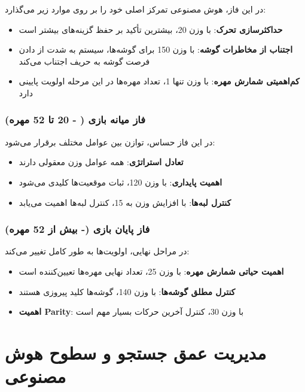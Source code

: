 \documentclass[12pt]{article}
\begin{document}
	در این فاز، هوش مصنوعی تمرکز اصلی خود را بر روی موارد زیر می‌گذارد:
	
	\begin{itemize}
		\item \textbf{حداکثرسازی تحرک}: با وزن 20، بیشترین تأکید بر حفظ گزینه‌های بیشتر است
		\item \textbf{اجتناب از مخاطرات گوشه}: با وزن 150 برای گوشه‌ها، سیستم به شدت از دادن فرصت گوشه به حریف اجتناب می‌کند
		\item \textbf{کم‌اهمیتی شمارش مهره}: با وزن تنها 1، تعداد مهره‌ها در این مرحله اولویت پایینی دارد
	\end{itemize}
	
	\subsubsection{فاز میانه بازی ( - 20 تا 52 مهره)}
	
	در این فاز حساس، توازن بین عوامل مختلف برقرار می‌شود:
	
	\begin{itemize}
		\item \textbf{تعادل استراتژی}: همه عوامل وزن معقولی دارند
		\item \textbf{اهمیت پایداری}: با وزن 120، ثبات موقعیت‌ها کلیدی می‌شود  
		\item \textbf{کنترل لبه‌ها}: با افزایش وزن به 15، کنترل لبه‌ها اهمیت می‌یابد
	\end{itemize}
	
	\subsubsection{فاز پایان بازی (- بیش از 52 مهره)}
	
	در مراحل نهایی، اولویت‌ها به طور کامل تغییر می‌کند:
	
	\begin{itemize}
		\item \textbf{اهمیت حیاتی شمارش مهره}: با وزن 25، تعداد نهایی مهره‌ها تعیین‌کننده است
		\item \textbf{کنترل مطلق گوشه‌ها}: با وزن 140، گوشه‌ها کلید پیروزی هستند
		\item \textbf{اهمیت Parity}: با وزن 30، کنترل آخرین حرکات بسیار مهم است
	\end{itemize}
	
	\section{مدیریت عمق جستجو و سطوح هوش مصنوعی}
	
\end{document}
